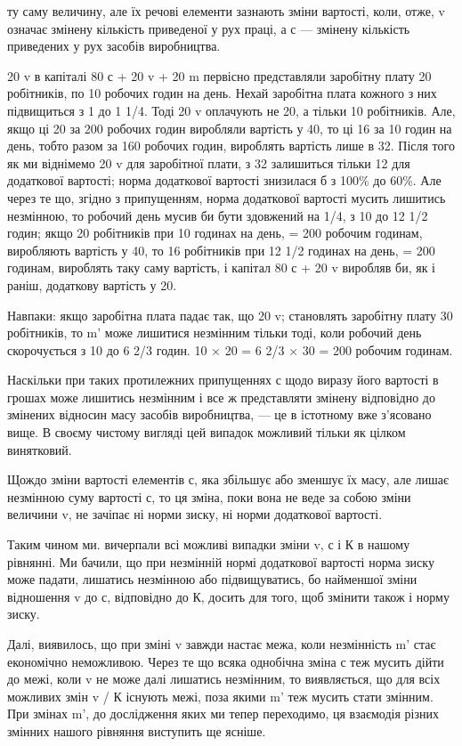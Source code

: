 \parcont{}  %
ту саму величину, але їх речові елементи зазнають зміни вартості,
коли, отже, v означає змінену кількість приведеної у рух
праці, а с — змінену кількість приведених у рух засобів виробництва.

20 v в капіталі 80 с + 20 v + 20 m первісно представляли заробітну
плату 20 робітників, по 10 робочих годин на день. Нехай
заробітна плата кожного з них підвищиться з 1 до 1 1/4. Тоді 20 v
оплачують не 20, а тільки 10 робітників. Але, якщо ці 20 за
200 робочих годин виробляли вартість у 40, то ці 16 за 10 годин
на день, тобто разом за 160 робочих годин, вироблять вартість
лише в 32. Після того як ми віднімемо 20 v для заробітної
плати, з 32 залишиться тільки 12 для додаткової вартості; норма
додаткової вартості знизилася б з 100\% до 60\%. Але через
те що, згідно з припущенням, норма додаткової вартості мусить
лишитись незмінною, то робочий день мусив би бути здовжений
на 1/4, з 10 до 12 1/2 годин; якщо 20 робітників при 10 годинах
на день, = 200 робочим годинам, виробляють вартість у 40, то
16 робітників при 12 1/2 годинах на день, = 200 годинам, вироблять
таку саму вартість, і капітал 80 с + 20 v виробляв би, як і раніш,
додаткову вартість у 20.

Навпаки: якщо заробітна плата падає так, що 20 v; становлять
заробітну плату 30 робітників, то m' може лишитися
незмінним тільки тоді, коли робочий день скорочується з 10
до 6 2/3 годин. 10 × 20 = 6 2/3 × 30 = 200 робочим годинам.

Наскільки при таких протилежних припущеннях с щодо виразу
його вартості в грошах може лишитись незмінним і все ж
представляти змінену відповідно до змінених відносин масу
засобів виробництва, — це в істотному вже з’ясовано вище.
В своєму чистому вигляді цей випадок можливий тільки як цілком
винятковий.

Щождо зміни вартості елементів с, яка збільшує або зменшує
їх масу, але лишає незмінною суму вартості с, то ця зміна, поки
вона не веде за собою зміни величини v, не зачіпає ні норми
зиску, ні норми додаткової вартості.

Таким чином ми. вичерпали всі можливі випадки зміни v, с
і К в нашому рівнянні. Ми бачили, що при незмінній нормі додаткової
вартості норма зиску може падати, лишатись незмінною
або підвищуватись, бо найменшої зміни відношення v до с,
відповідно до К, досить для того, щоб змінити також і норму
зиску.

Далі, виявилось, що при зміні v завжди настає межа, коли незмінність
m' стає економічно неможливою. Через те що всяка
однобічна зміна с теж мусить дійти до межі, коли v не може
далі лишатись незмінним, то виявляється, що для всіх можливих
змін v / К існують межі, поза якими m' теж мусить стати змінним.
При змінах m', до дослідження яких ми тепер переходимо, ця
взаємодія різних змінних нашого рівняння виступить ще ясніше.
